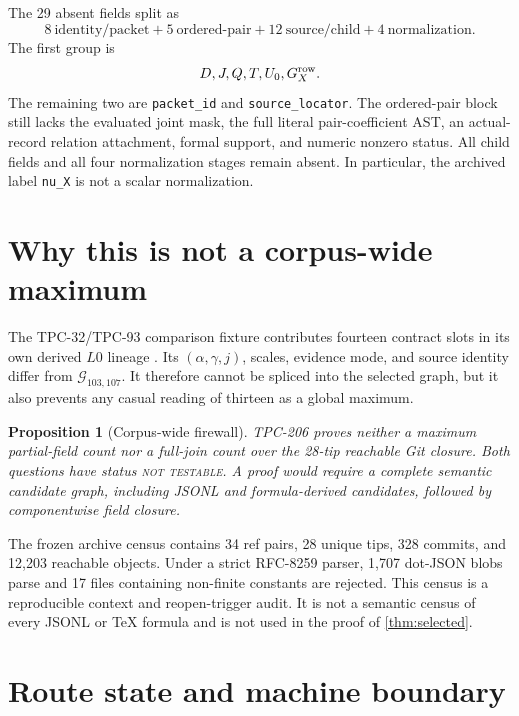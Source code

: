 \documentclass[11pt]{article}
\newtheorem{proposition}{Proposition}
\newcommand{\code}[1]{\nolinkurl{#1}}
\begin{document}
The 29 absent fields split as
\[
 8\ \text{identity/packet}
 +5\ \text{ordered-pair}
 +12\ \text{source/child}
 +4\ \text{normalization}.
\]
The first group is
\[
 D,J,Q,T,U_0,G_X^{\rm row}.
\]
The remaining two are \code{packet_id} and \code{source_locator}.
The ordered-pair block still lacks the evaluated joint mask, the full
literal pair-coefficient AST, an actual-record relation attachment, formal
support, and numeric nonzero status.  All child fields and all four
normalization stages remain absent.  In particular, the archived label
\code{nu_X} is not a scalar normalization.

\section{Why this is not a corpus-wide maximum}

The TPC-32/TPC-93 comparison fixture contributes fourteen contract slots in
its own derived \(L0\) lineage \citep{WangTPC32,WangTPC93}.  Its
\((\alpha,\gamma,j)\), scales, evidence mode, and source identity differ
from \(\mathcal G_{103,107}\).  It therefore cannot be spliced into the
selected graph, but it also prevents any casual reading of thirteen as a
global maximum.

\begin{proposition}[Corpus-wide firewall]
TPC-206 proves neither a maximum partial-field count nor a full-join count
over the 28-tip reachable Git closure.  Both questions have status
\textnormal{\textsc{not testable}}.  A proof would require a complete semantic candidate graph,
including JSONL and formula-derived candidates, followed by componentwise
field closure.
\end{proposition}

The frozen archive census contains 34 ref pairs, 28 unique tips, 328
commits, and 12,203 reachable objects.  Under a strict RFC-8259 parser,
1,707 dot-JSON blobs parse and 17 files containing non-finite constants are
rejected.  This census is a reproducible context and reopen-trigger audit.
It is not a semantic census of every JSONL or \TeX{} formula and is not used
in the proof of \cref{thm:selected}.

\section{Route state and machine boundary}
\end{document}
